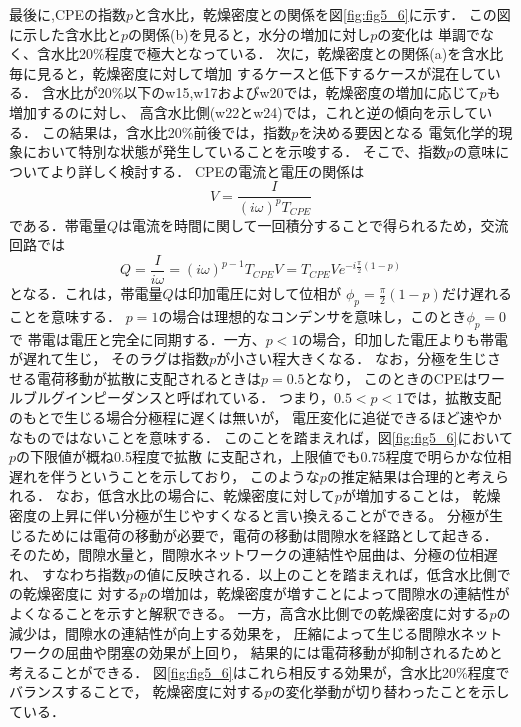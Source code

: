 最後に,CPEの指数$p$と含水比，乾燥密度との関係を図\ref{fig:fig5_6}に示す．
この図に示した含水比と$p$の関係(b)を見ると，水分の増加に対し$p$の変化は
単調でなく、含水比20\%程度で極大となっている．
次に，乾燥密度との関係(a)を含水比毎に見ると，乾燥密度に対して増加
するケースと低下するケースが混在している．
含水比が20\%以下のw15,w17およびw20では，乾燥密度の増加に応じて$p$も増加するのに対し、
高含水比側(w22とw24)では，これと逆の傾向を示している．
この結果は，含水比20\%前後では，指数$p$を決める要因となる
電気化学的現象において特別な状態が発生していることを示唆する．
そこで、指数$p$の意味についてより詳しく検討する．
CPEの電流と電圧の関係は
\begin{equation}
	V=\frac{I}{(i\omega )^pT_{CPE}}
	\label{eqn:}
\end{equation}
である．帯電量$Q$は電流を時間に関して一回積分することで得られるため，交流回路では
\begin{equation}
	Q=\frac{I}{i \omega}=(i\omega)^{p-1}T_{CPE}V=T_{CPE}Ve^{-i\frac{\pi}{2}(1-p)}
	\label{eqn:}
\end{equation}
となる．これは，帯電量$Q$は印加電圧に対して位相が
$\phi_p=\frac{\pi}{2}(1-p)$だけ遅れることを意味する．
$p=1$の場合は理想的なコンデンサを意味し，このとき$\phi_p=0$で
帯電は電圧と完全に同期する．一方、$p<1$の場合，印加した電圧よりも帯電が遅れて生じ，
そのラグは指数$p$が小さい程大きくなる．
なお，分極を生じさせる電荷移動が拡散に支配されるときは$p=0.5$となり，
このときのCPEはワールブルグインピーダンスと呼ばれている．
つまり，$0.5<p<1$では，拡散支配のもとで生じる場合分極程に遅くは無いが，
電圧変化に追従できるほど速やかなものではないことを意味する．
このことを踏まえれば，図\ref{fig:fig5_6}において$p$の下限値が概ね0.5程度で拡散
に支配され，上限値でも0.75程度で明らかな位相遅れを伴うということを示しており，
このような$p$の推定結果は合理的と考えられる．
なお，低含水比の場合に、乾燥密度に対して$p$が増加することは，
乾燥密度の上昇に伴い分極が生じやすくなると言い換えることができる。
分極が生じるためには電荷の移動が必要で，電荷の移動は間隙水を経路として起きる．
そのため，間隙水量と，間隙水ネットワークの連結性や屈曲は、分極の位相遅れ、
すなわち指数$p$の値に反映される．以上のことを踏まえれば，低含水比側での乾燥密度に
対する$p$の増加は，乾燥密度が増すことによって間隙水の連結性がよくなることを示すと解釈できる。
一方，高含水比側での乾燥密度に対する$p$の減少は，間隙水の連結性が向上する効果を，
圧縮によって生じる間隙水ネットワークの屈曲や閉塞の効果が上回り，
結果的には電荷移動が抑制されるためと考えることができる．
図\ref{fig:fig5_6}はこれら相反する効果が，含水比20\%程度でバランスすることで，
乾燥密度に対する$p$の変化挙動が切り替わったことを示している．
